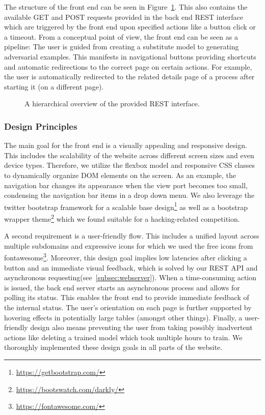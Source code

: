 The structure of the front end can be seen in Figure~\ref{fig:rest_api}.
This also contains the available GET and POST requests provided in the back end REST interface which are triggered by the front end upon specified actions like a button click or a timeout.
From a conceptual point of view, the front end can be seen as a pipeline: The user is guided from creating a substitute model to generating adversarial examples.
This manifests in navigational buttons providing shortcuts and automatic redirections to the correct page on certain actions.
For example, the user is automatically redirected to the related details page of a process after starting it (on a different page).

\begin{figure}
	
	\caption{A hierarchical overview of the provided REST interface.}\label{fig:rest_api}
\end{figure}

\subsubsection{Design Principles}
The main goal for the front end is a visually appealing and responsive design.
This includes the scalability of the website across different screen sizes and even device types.
Therefore, we utilize the flexbox model and responsive CSS classes to dynamically organize DOM elements on the screen.
As an example, the navigation bar changes its appearance when the view port becomes too small, condensing the navigation bar items in a drop down menu.
We also leverage the twitter bootstrap framework for a scalable base design\footnote{\url{https://getbootstrap.com/}} as well as a bootstrap wrapper theme\footnote{\url{https://bootswatch.com/darkly/}} which we found suitable for a hacking-related competition.

A second requirement is a user-friendly flow.
This includes a unified layout across multiple subdomains and expressive icons for which we used the free icons from fontawesome\footnote{\url{https://fontawesome.com/}}.
Moreover, this design goal implies low latencies after clicking a button and an immediate visual feedback, which is solved by our REST API and asynchronous requesting(see~\ref{subsec:webserver}).
When a time-consuming action is issued, the back end server starts an asynchronous process and allows for polling its status.
This enables the front end to provide immediate feedback of the internal status.
The user's orientation on each page is further supported by hovering effects in potentially large tables (amongst other things).
Finally, a user-friendly design also means preventing the user from taking possibly inadvertent actions like deleting a trained model which took multiple hours to train.
We thoroughly implemented these design goals in all parts of the website.

